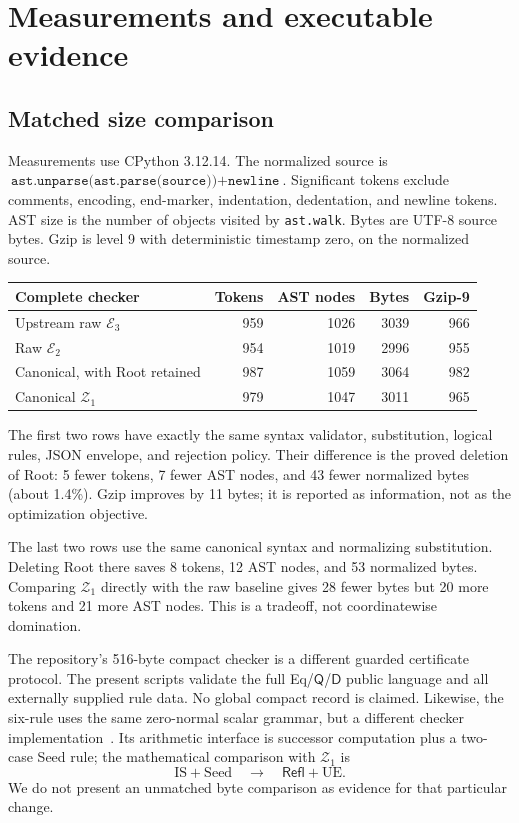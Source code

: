 \documentclass[11pt]{article}
\theoremstyle{definition}\newtheorem{definition}[theorem]{Definition}
\newcommand{\Ethree}{\mathcal E_3}
\newcommand{\Rtwo}{\mathcal E_2}
\newcommand{\Zone}{\mathcal Z_1}
\newcommand{\Q}{\mathsf Q}
\newcommand{\D}{\mathsf D}
\newcommand{\Refl}{\mathsf{Refl}}
\begin{document}
\section{Measurements and executable evidence}
\label{sec:evidence}

\subsection{Matched size comparison}

Measurements use CPython 3.12.14. The normalized source is
$\texttt{ast.unparse(ast.parse(source))}+\texttt{newline}$.
Significant tokens exclude comments, encoding, end-marker, indentation,
dedentation, and newline tokens. AST size is the number of objects
visited by \texttt{ast.walk}. Bytes are UTF-8 source bytes. Gzip is
level 9 with deterministic timestamp zero, on the normalized source.
\begin{center}
\begin{tabular}{@{}lrrrr@{}}
\toprule
Complete checker & Tokens & AST nodes & Bytes & Gzip-9\\
\midrule
Upstream raw $\Ethree$ & 959 & 1026 & 3039 & 966\\
Raw $\Rtwo$ & 954 & 1019 & 2996 & 955\\
Canonical, with Root retained & 987 & 1059 & 3064 & 982\\
Canonical $\Zone$ & 979 & 1047 & 3011 & 965\\
\bottomrule
\end{tabular}
\end{center}
The first two rows have exactly the same syntax validator, substitution,
logical rules, JSON envelope, and rejection policy. Their difference is
the proved deletion of Root: 5 fewer tokens, 7 fewer AST nodes, and
43 fewer normalized bytes (about 1.4\%). Gzip improves by 11 bytes;
it is reported as information, not as the optimization objective.

The last two rows use the same canonical syntax and normalizing
substitution. Deleting Root there saves 8 tokens, 12 AST nodes, and
53 normalized bytes. Comparing $\Zone$ directly with the raw baseline
gives 28 fewer bytes but 20 more tokens and 21 more AST nodes. This is a
tradeoff, not coordinatewise domination.

The repository's 516-byte compact checker is a different guarded
certificate protocol. The present scripts validate the full Eq/$\Q$/$\D$
public language and all externally supplied rule data. No global compact
record is claimed. Likewise, the six-rule
 uses the same zero-normal scalar
grammar, but a different checker implementation~\cite{seed}. Its
arithmetic interface is successor computation plus a two-case Seed rule;
the mathematical comparison with $\Zone$ is
\[
 \mathrm{IS}+\mathrm{Seed}\quad\longrightarrow\quad\Refl+\mathrm{UE}.
\]
We do not present an unmatched byte comparison as evidence for that
particular change.
\end{document}

